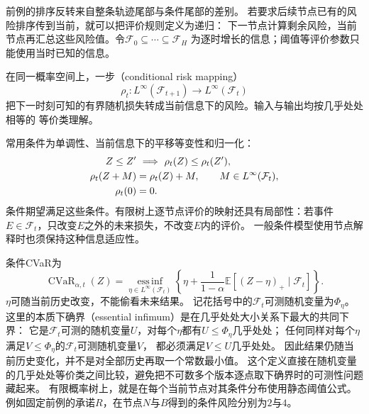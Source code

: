 前例的排序反转来自整条轨迹尾部与条件尾部的差别。
若要求后续节点已有的风险排序传到当前，就可以把评价规则定义为递归：
下一节点计算剩余风险，当前节点再汇总这些风险值。令$\mathcal F_0\subseteq\cdots\subseteq\mathcal F_H$
为逐时增长的信息；阈值等评价参数只能使用当时已知的信息。
\begin{definition}[一步条件风险映射]
\label{def:decision-conditional-risk-mapping}
在同一概率空间上，一步（conditional risk mapping）
\[
  \rho_t:L^\infty(\mathcal F_{t+1})\longrightarrow L^\infty(\mathcal F_t)
\]
把下一时刻可知的有界随机损失转成当前信息下的风险。输入与输出均按几乎处处相等的
等价类理解。
\end{definition}
常用条件为单调性、当前信息下的平移等变性和归一化：
\begin{align}
  Z\leq Z'&\ \Longrightarrow\ \rho_t(Z)\leq\rho_t(Z'),
  \label{eq:decision-conditional-risk-monotonicity}\\
  \rho_t(Z+M)&=\rho_t(Z)+M,\qquad M\in L^\infty(\mathcal F_t),
  \label{eq:decision-conditional-risk-translation}\\
  \rho_t(0)&=0.\notag
\end{align}
条件期望满足这些条件。有限树上逐节点评价的映射还具有局部性：若事件
$E\in\mathcal F_t$，只改变$E$之外的未来损失，不改变$E$内的评价。
一般条件模型使用节点解释时也须保持这种信息适应性。

条件CVaR为
\begin{equation}
  \operatorname{CVaR}_{\alpha,t}(Z)
  =\operatorname*{ess\,inf}_{\eta\in L^\infty(\mathcal F_t)}
    \left\{\eta+\frac{1}{1-\alpha}
      \mathbb E[(Z-\eta)_+\mid\mathcal F_t]\right\}.
  \label{eq:decision-conditional-cvar}
\end{equation}
$\eta$可随当前历史改变，不能偷看未来结果。
记花括号中的$\mathcal F_t$可测随机变量为$\Phi_\eta$。
这里的本质下确界（essential infimum）是在几乎处处大小关系下最大的共同下界：
它是$\mathcal F_t$可测的随机变量$U$，对每个$\eta$都有$U\leq\Phi_\eta$几乎处处；
任何同样对每个$\eta$满足$V\leq\Phi_\eta$的$\mathcal F_t$可测随机变量$V$，
都必须满足$V\leq U$几乎处处。
因此结果仍随当前历史变化，并不是对全部历史再取一个常数最小值。
这个定义直接在随机变量的几乎处处等价类之间比较，避免把不可数多个版本逐点取下确界时的可测性问题藏起来。
有限概率树上，就是在每个当前节点对其条件分布使用静态阈值公式。
例如固定前例的承诺$R$，在节点$N$与$B$得到的条件风险分别为$2$与$4$。

